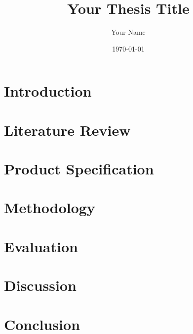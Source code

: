 \documentclass{report}
\title{Your Thesis Title}
\author{Your Name}
\date{\today}
\begin{document}
\maketitle

\begin{abstract}
\end{abstract}

\tableofcontents

\chapter{Introduction}

\chapter{Literature Review}


\chapter{Product Specification}


\chapter{Methodology}


\chapter{Evaluation}


\chapter{Discussion}

\chapter{Conclusion}

\begin{thebibliography}{}
\end{thebibliography}
\end{document}
